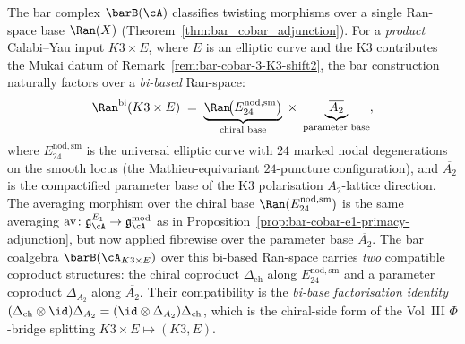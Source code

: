 \begin{remark}
\label{rem:bar-cobar-4-bibased-ran}
The bar complex
$\barB(\cA)$ classifies twisting morphisms over a single Ran-space
base $\Ran(X)$ (Theorem~\ref{thm:bar_cobar_adjunction}). For a
\emph{product} Calabi--Yau input $K3\times E$, where $E$ is an
elliptic curve and the K3 contributes the Mukai datum of
Remark~\ref{rem:bar-cobar-3-K3-shift2}, the bar construction
naturally factors over a \emph{bi-based} Ran-space:
\[
\Ran^{\mathrm{bi}}(K3\times E)
\;=\;
\underbrace{\Ran\!\bigl(E^{\mathrm{nod,sm}}_{24}\bigr)}_{\text{chiral
base}}
\;\times\;
\underbrace{\overline{A_2}}_{\text{parameter base}},
\]
where $E^{\mathrm{nod,sm}}_{24}$ is the universal elliptic curve
with $24$ marked nodal degenerations on the smooth locus
(the Mathieu-equivariant $24$-puncture configuration), and
$\overline{A_2}$ is the compactified parameter
base of the K3 polarisation $A_2$-lattice direction. The
averaging morphism over the chiral base
$\Ran(E^{\mathrm{nod,sm}}_{24})$ is the same averaging
$\mathrm{av}\colon \mathfrak{g}^{E_1}_\cA \to
\mathfrak{g}^{\mathrm{mod}}_\cA$ as in
Proposition~\ref{prop:bar-cobar-e1-primacy-adjunction}, but now
applied fibrewise over the parameter base $\overline{A_2}$.
The bar coalgebra
$\barB(\cA_{K3\times E})$ over this bi-based Ran-space carries
\emph{two} compatible coproduct structures: the chiral coproduct
$\Delta_{\mathrm{ch}}$ along $E^{\mathrm{nod,sm}}_{24}$ and a
parameter coproduct $\Delta_{A_2}$ along $\overline{A_2}$. Their
compatibility is the \emph{bi-base factorisation identity}
$(\Delta_{\mathrm{ch}}\otimes\id)\Delta_{A_2}
= (\id\otimes\Delta_{A_2})\Delta_{\mathrm{ch}}$,
which is the chiral-side form of the Vol~III $\Phi$-bridge
splitting $K3\times E \mapsto (K3, E)$.
\end{remark}


